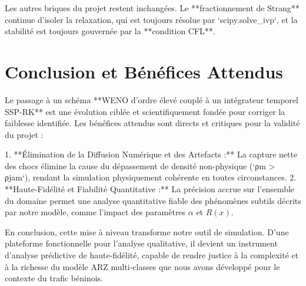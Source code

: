 Les autres briques du projet restent inchangées. Le **fractionnement de Strang** continue d'isoler la relaxation, qui est toujours résolue par `scipy.solve_ivp`, et la stabilité est toujours gouvernée par la **condition CFL**.

\section{Conclusion et Bénéfices Attendus}
\label{sec:conclusion_weno}

Le passage à un schéma **WENO d'ordre élevé couplé à un intégrateur temporel SSP-RK** est une évolution ciblée et scientifiquement fondée pour corriger la faiblesse identifiée. Les bénéfices attendus sont directs et critiques pour la validité du projet :

1.  **Élimination de la Diffusion Numérique et des Artefacts :** La capture nette des chocs élimine la cause du dépassement de densité non-physique (`ρm > ρjam`), rendant la simulation physiquement cohérente en toutes circonstances.
2.  **Haute-Fidélité et Fiabilité Quantitative :** La précision accrue sur l'ensemble du domaine permet une analyse quantitative fiable des phénomènes subtils décrits par notre modèle, comme l'impact des paramètres \(\alpha\) et \(R(x)\).

En conclusion, cette mise à niveau transforme notre outil de simulation. D'une plateforme fonctionnelle pour l'analyse qualitative, il devient un instrument d'analyse prédictive de haute-fidélité, capable de rendre justice à la complexité et à la richesse du modèle ARZ multi-classes que nous avons développé pour le contexte du trafic béninois.